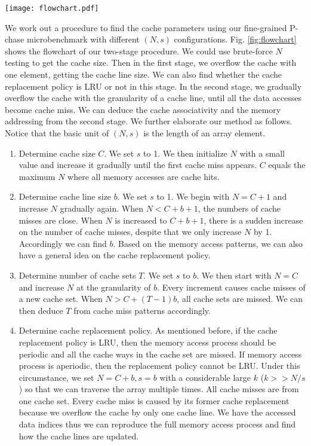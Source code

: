 \documentclass[10pt,journal,compsoc]{IEEEtran}
\theoremstyle{definition}
\begin{document}
\begin{figure*}
  \centering
\texttt{[image: flowchart.pdf]}
  \caption{Flowchart of applying fine-grained P-chase.}\label{fig:flowchart}
\end{figure*}


We work out a procedure to find the cache parameters using our fine-grained P-chase microbenchmark with different $(N, s)$ configurations. Fig. \ref{fig:flowchart} shows the flowchart of our two-stage procedure. We could use brute-force $N$ testing to get the cache size. Then in the first stage, we overflow the cache with one element, getting the cache line size. We can also find whether the cache replacement policy is LRU or not in this stage. In the second stage, we gradually overflow the cache with the granularity of a cache line, until all the data accesses become cache miss. We can deduce the cache associativity and the memory addressing from the second stage. We further elaborate our method as follows. Notice that the basic unit of $(N, s)$ is the length of an array element.

\begin{enumerate}
\item Determine cache size $C$. We set $s$ to 1. We then initialize $N$ with a small value and increase it gradually until the first cache miss appears. $C$ equals the maximum $N$ where all memory accesses are cache hits.
\item Determine cache line size $b$. We set $s$ to 1. We begin with $N=C+1$ and increase $N$ gradually again. When $N<C+b+1$, the numbers of cache misses are close. When $N$ is increased to $C+b+1$, there is a sudden increase on the number of cache misses, despite that we only increase $N$ by 1. Accordingly we can find $b$. Based on the memory access patterns, we can also have a general idea on the cache replacement policy.
\item Determine number of cache sets $T$. We set $s$ to $b$. We then start with $N=C$ and increase $N$ at the granularity of $b$. Every increment causes cache misses of a new cache set. When $N>C+(T-1)b$, all cache sets are missed. We can then deduce $T$ from cache miss patterns accordingly.
\item Determine cache replacement policy. As mentioned before, if the cache replacement policy is LRU, then the memory access process should be periodic and all the cache ways in the cache set are missed. If memory access process is aperiodic, then the replacement policy cannot be LRU. Under this circumstance, we set $N=C+b, s=b$ with a considerable large $k$ ($k>>N/s$) so that we can traverse the array multiple times. All cache misses are from one cache set. Every cache miss is caused by its former cache replacement because we overflow the cache by only one cache line. We have the accessed data indices thus we can reproduce the full memory access process and find how the cache lines are updated.
\end{enumerate}
\end{document}
